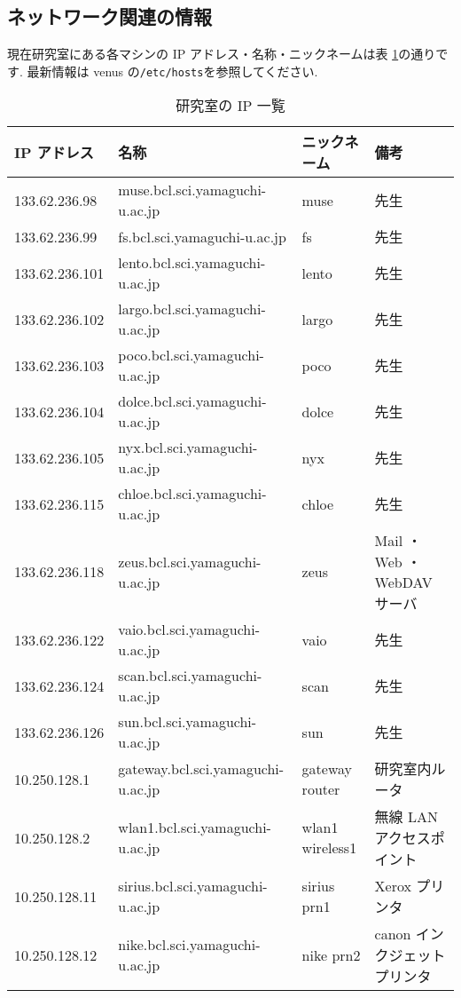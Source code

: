 \documentclass{jarticle}
\begin{document}
\subsection{ネットワーク関連の情報}

現在研究室にある各マシンの IP アドレス・名称・ニックネームは表
\ref{tab:IP}の通りです.
最新情報は venus の\verb|/etc/hosts|を参照してください.
{\small
\begin{table}[tbp]
\centering
\caption{研究室の IP 一覧 } \label{tab:IP}
\begin{tabular}[t]{llll}\hline
IP アドレス &	名称 &					ニックネーム &
備考 \\ \hline
133.62.236.98 &	muse.bcl.sci.yamaguchi-u.ac.jp &	muse & 先生\\
133.62.236.99 &	fs.bcl.sci.yamaguchi-u.ac.jp &	fs & 先生\\
133.62.236.101 &lento.bcl.sci.yamaguchi-u.ac.jp&	lento & 先生\\
133.62.236.102 &largo.bcl.sci.yamaguchi-u.ac.jp &	largo & 先生\\
133.62.236.103 &poco.bcl.sci.yamaguchi-u.ac.jp &	poco & 先生\\
133.62.236.104 &dolce.bcl.sci.yamaguchi-u.ac.jp &	dolce & 先生\\
133.62.236.105 &nyx.bcl.sci.yamaguchi-u.ac.jp   &       nyx & 先生\\
133.62.236.115 &chloe.bcl.sci.yamaguchi-u.ac.jp &	chloe & 先生\\
133.62.236.118 &zeus.bcl.sci.yamaguchi-u.ac.jp &	zeus & Mail ・ Web ・ WebDAV サーバ\\
133.62.236.122 &vaio.bcl.sci.yamaguchi-u.ac.jp &	vaio & 先生\\
133.62.236.124 &scan.bcl.sci.yamaguchi-u.ac.jp &	scan & 先生\\
133.62.236.126 &sun.bcl.sci.yamaguchi-u.ac.jp &		sun & 先生\\
\hline
10.250.128.1 &	gateway.bcl.sci.yamaguchi-u.ac.jp &	gateway router & 研究室内ルータ\\
10.250.128.2 &	wlan1.bcl.sci.yamaguchi-u.ac.jp &	wlan1 wireless1 & 無線 LAN アクセスポイント\\
10.250.128.11 &	sirius.bcl.sci.yamaguchi-u.ac.jp &	sirius prn1 &	Xerox プリンタ \\
10.250.128.12 &	nike.bcl.sci.yamaguchi-u.ac.jp &	nike prn2 &	canon インクジェットプリンタ \\

\end{tabular}
\end{table}}
\end{document}
